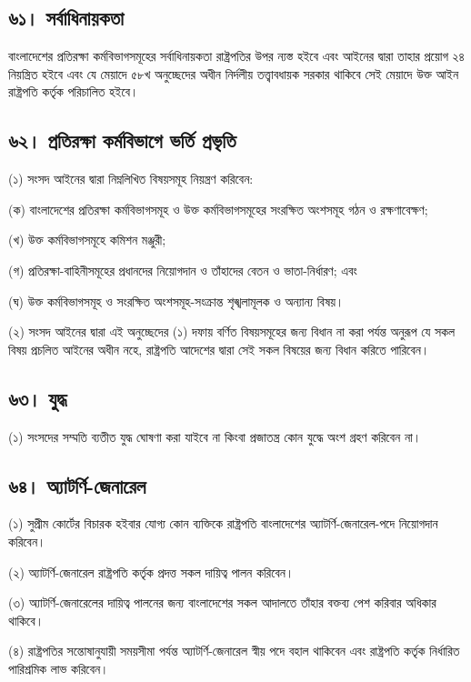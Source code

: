 \documentclass[11pt]{article}
\begin{document}
\subsection{৬১। সর্বাধিনায়কতা}
\label{sec:org87c19ad}
বাংলাদেশের প্রতিরক্ষা কর্মবিভাগসমূহের সর্বাধিনায়কতা রাষ্ট্রপতির উপর ন্যস্ত
হইবে এবং আইনের দ্বারা তাহার প্রয়োগ ২৪ নিয়ন্ত্রিত হইবে এবং যে মেয়াদে ৫৮খ
অনুচ্ছেদের অধীন নির্দলীয় তত্ত্বাবধায়ক সরকার থাকিবে সেই মেয়াদে উক্ত আইন
রাষ্ট্রপতি কর্তৃক পরিচালিত হইবে।

\subsection{৬২। প্রতিরক্ষা কর্মবিভাগে ভর্তি প্রভৃতি}
\label{sec:orge253f09}
(১) সংসদ আইনের দ্বারা নিম্নলিখিত বিষয়সমূহ নিয়ন্ত্রণ করিবেন:

(ক) বাংলাদেশের প্রতিরক্ষা কর্মবিভাগসমূহ ও উক্ত কর্মবিভাগসমূহের সংরক্ষিত অংশসমূহ
    গঠন ও রক্ষণাবেক্ষণ;

(খ) উক্ত কর্মবিভাগসমূহে কমিশন মঞ্জুরী;

(গ) প্রতিরক্ষা-বাহিনীসমূহের প্রধানদের নিয়োগদান ও তাঁহাদের বেতন ও
    ভাতা-নির্ধারণ; এবং

(ঘ) উক্ত কর্মবিভাগসমূহ ও সংরক্ষিত অংশসমূহ-সংক্রান্ত শৃঙ্খলামূলক ও অন্যান্য বিষয়।

(২) সংসদ আইনের দ্বারা এই অনুচ্ছেদের (১) দফায় বর্ণিত বিষয়সমূহের জন্য বিধান না
    করা পর্যন্ত অনুরূপ যে সকল বিষয় প্রচলিত আইনের অধীন নহে, রাষ্ট্রপতি আদেশের
    দ্বারা সেই সকল বিষয়ের জন্য বিধান করিতে পারিবেন।

\subsection{৬৩। যুদ্ধ}
\label{sec:org76f286a}
(১) সংসদের সম্মতি ব্যতীত যুদ্ধ ঘোষণা করা যাইবে না কিংবা প্রজাতন্ত্র কোন যুদ্ধে অংশ গ্রহণ করিবেন না।

\subsection{৬৪। অ্যাটর্ণি-জেনারেল}
\label{sec:orgfcb364b}
(১) সুপ্রীম কোর্টের বিচারক হইবার যোগ্য কোন ব্যক্তিকে রাষ্ট্রপতি বাংলাদেশের
    অ্যাটর্ণি-জেনারেল-পদে নিয়োগদান করিবেন।

(২) অ্যাটর্ণি-জেনারেল রাষ্ট্রপতি কর্তৃক প্রদত্ত সকল দায়িত্ব পালন করিবেন।

(৩) অ্যাটর্ণি-জেনারেলের দায়িত্ব পালনের জন্য বাংলাদেশের সকল আদালতে তাঁহার
    বক্তব্য পেশ করিবার অধিকার থাকিবে।

(৪) রাষ্ট্রপতির সন্তোষানুযায়ী সময়সীমা পর্যন্ত অ্যাটর্ণি-জেনারেল স্বীয় পদে বহাল
    থাকিবেন এবং রাষ্ট্রপতি কর্তৃক নির্ধারিত পারিশ্রমিক লাভ করিবেন।
\end{document}
